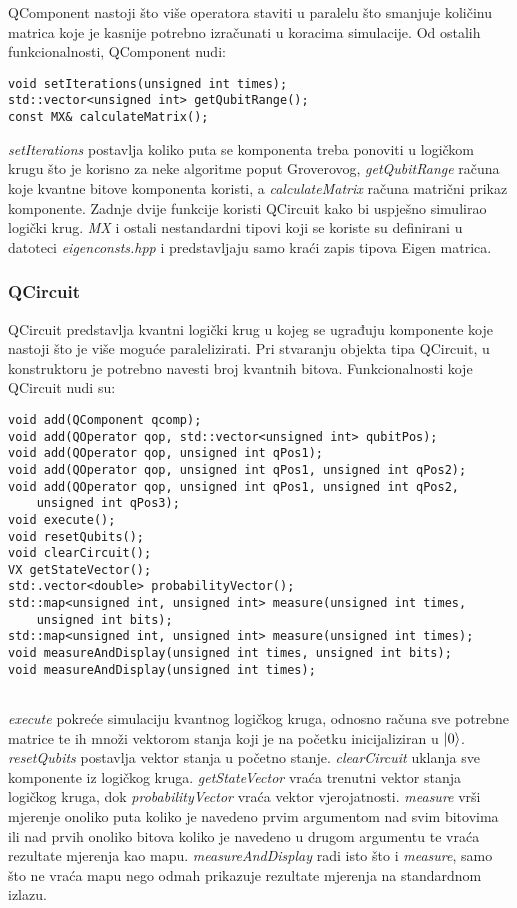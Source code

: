 QComponent nastoji što više operatora staviti u paralelu što smanjuje količinu matrica koje je kasnije potrebno izračunati u koracima simulacije. Od ostalih funkcionalnosti, QComponent nudi:
\begin{lstlisting}
void setIterations(unsigned int times);
std::vector<unsigned int> getQubitRange();
const MX& calculateMatrix();
\end{lstlisting}
\emph{setIterations} postavlja koliko puta se komponenta treba ponoviti u logičkom krugu što je korisno za neke algoritme poput Groverovog, \emph{getQubitRange} računa koje kvantne bitove komponenta koristi, a \emph{calculateMatrix} računa matrični prikaz komponente. Zadnje dvije funkcije koristi QCircuit kako bi uspješno simulirao logički krug. \emph{MX} i ostali nestandardni tipovi koji se koriste su definirani u datoteci \emph{eigenconsts.hpp} i predstavljaju samo kraći zapis tipova Eigen matrica.

\subsubsection{QCircuit}

QCircuit predstavlja kvantni logički krug u kojeg se ugrađuju komponente koje nastoji što je više moguće paralelizirati. Pri stvaranju objekta tipa QCircuit, u konstruktoru je potrebno navesti broj kvantnih bitova. Funkcionalnosti koje QCircuit nudi su:
\begin{lstlisting}
void add(QComponent qcomp);
void add(QOperator qop, std::vector<unsigned int> qubitPos);
void add(QOperator qop, unsigned int qPos1);
void add(QOperator qop, unsigned int qPos1, unsigned int qPos2);
void add(QOperator qop, unsigned int qPos1, unsigned int qPos2,
	unsigned int qPos3);
void execute();
void resetQubits();
void clearCircuit();
VX getStateVector();
std:.vector<double> probabilityVector();
std::map<unsigned int, unsigned int> measure(unsigned int times,
	unsigned int bits);
std::map<unsigned int, unsigned int> measure(unsigned int times);
void measureAndDisplay(unsigned int times, unsigned int bits);
void measureAndDisplay(unsigned int times);


\end{lstlisting}
\emph{execute} pokreće simulaciju kvantnog logičkog kruga, odnosno računa sve potrebne matrice te ih množi vektorom stanja koji je na početku inicijaliziran u $\ket{0}$. \emph{resetQubits} postavlja vektor stanja u početno stanje. \emph{clearCircuit} uklanja sve komponente iz logičkog kruga. \emph{getStateVector} vraća trenutni vektor stanja logičkog kruga, dok \emph{probabilityVector} vraća vektor vjerojatnosti. \emph{measure} vrši mjerenje onoliko puta koliko je navedeno prvim argumentom nad svim bitovima ili nad prvih onoliko bitova koliko je navedeno u drugom argumentu te vraća rezultate mjerenja kao mapu. \emph{measureAndDisplay} radi isto što i \emph{measure}, samo što ne vraća mapu nego odmah prikazuje rezultate mjerenja na standardnom izlazu.

